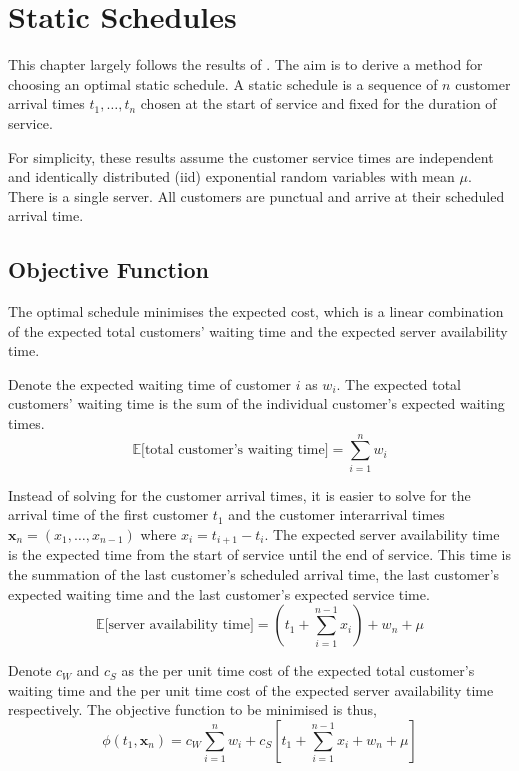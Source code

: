 \chapter{Static Schedules}
\label{chap:Static}
This chapter largely follows the results of \citet{Pegden}. The aim is to derive a method for choosing an optimal static schedule. A static schedule is a sequence of $n$ customer arrival times $t_{1}, \ldots, t_{n}$ chosen at the start of service and fixed for the duration of service. 

For simplicity, these results assume the customer service times are independent and identically distributed (iid) exponential random variables with mean $\mu$. There is a single server. All customers are punctual and arrive at their scheduled arrival time.

\section{Objective Function}
The optimal schedule minimises the expected cost, which is a linear combination of the expected total customers' waiting time and the expected server availability time.

Denote the expected waiting time of customer $i$ as $w_{i}$. The expected total customers' waiting time is the sum of the individual customer's expected waiting times.
\begin{equation}
	\mathbb{E} \Big[\text{total customer's waiting time} \Big] = \sum_{i = 1}^{n} w_{i}
\end{equation}

Instead of solving for the customer arrival times, it is easier to solve for the arrival time of the first customer $t_{1}$ and the customer interarrival times $\mathbf{x}_{n} = (x_{1}, \ldots, x_{n - 1})$ where $x_{i} = t_{i + 1} - t_{i}$. The expected server availability time is the expected time from the start of service until the end of service. This time is the summation of the last customer's scheduled arrival time, the last customer's expected waiting time and the last customer's expected service time.
\begin{equation}
	\mathbb{E} \Big[\text{server availability time} \Big] = \left( t_{1} + \sum_{i = 1}^{n - 1} x_{i} \right) + w_{n} + \mu
\end{equation}

Denote $c_{W}$ and $c_{S}$ as the per unit time cost of the expected total customer's waiting time and the per unit time cost of the expected server availability time respectively. The objective function to be minimised is thus,
\begin{equation}
	\phi (t_{1}, \mathbf{x}_{n}) = c_{W} \sum_{i = 1}^{n} w_{i} + c_{S} \left[ t_{1} + \sum_{i = 1}^{n - 1} x_{i} + w_{n} + \mu \right]
\end{equation}

